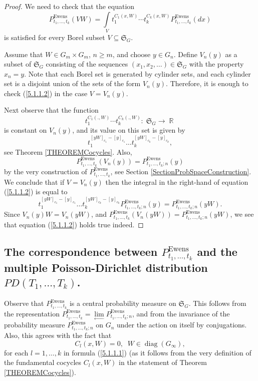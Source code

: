 \documentclass[12pt]{amsart}
\theoremstyle{definition}
\numberwithin{equation}{section}
\DeclareMathOperator{\R}{\mathbb{R}}
\DeclareMathOperator{\diag}{diag}
\DeclareMathOperator{\Ewens}{Ewens}
\begin{document}
\begin{proof}
We need to check that  the equation
\begin{equation}\label{5.1.1.2}
P_{t_1,\ldots,t_k}^{\Ewens}\left(VW\right)
=\int\limits_{V}t_1^{C_1\left(x,W\right)}\cdots t_k^{C_k\left(x,W\right)}
P_{t_1,\ldots,t_k}^{\Ewens}\left(dx\right)
\end{equation}
is satisfied for every Borel subset $V\subseteq\mathfrak{S}_{G}$.

Assume that $W\in G_m\times G_m$, $n\geq m$, and choose $y\in G_n$.
Define $V_n(y)$ as a subset of $\mathfrak{S}_{G}$ consisting of the sequences
$\left(x_1, x_2,\ldots\right)\in\mathfrak{S}_{G}$ with the property $x_n=y$.
Note that each Borel set is generated by cylinder sets, and each cylinder set is a disjoint union of the sets of the form $V_n(y)$. Therefore, it is enough to check (\ref{5.1.1.2}) in the case $V=V_n(y)$.

Next observe that the function
$$
t_1^{C_1\left(.,W\right)}\cdots t_k^{C_k\left(.,W\right)}:\;\mathfrak{S}_{G}\longrightarrow\R
$$
is constant on $V_n(y)$, and its value on this set is given by
$$
t_1^{\left[y W\right]_{c_1}-[y]_{c_1}}\ldots t_k^{\left[yW\right]_{c_k}-\left[y\right]_{c_k}},
$$
see Theorem \ref{THEOREMCocycles}. Also,
$$
P_{t_1,\ldots,t_k}^{\Ewens}\left(V_n(y)\right)=P_{t_1,\ldots,t_k;n}^{\Ewens}\left(y\right)
$$
by the very construction of $P_{t_1,\ldots,t_k}^{\Ewens}$, see Section \ref{SectionProbSpaceConstruction}. We conclude that if $V=V_n(y)$
then the integral in the right-hand of equation (\ref{5.1.1.2}) is equal to
\begin{equation}
t_1^{\left[y W\right]_{c_1}-[y]_{c_1}}\ldots t_k^{\left[yW\right]_{c_k}-\left[y\right]_{c_k}}
P_{t_1,\ldots,t_k;n}^{\Ewens}\left(y\right)=P_{t_1,\ldots,t_k;n}^{\Ewens}\left(yW\right).
\end{equation}
Since $V_n(y) W=V_n\left(yW\right)$, and
$P_{t_1,\ldots,t_k}^{\Ewens}\left(V_n\left(yW\right)\right)=
P_{t_1,\ldots,t_k;n}^{\Ewens}\left(yW\right)$, we see that equation (\ref{5.1.1.2}) holds true indeed.
\end{proof}
\subsection{The correspondence between $P_{t_1,\ldots,t_k}^{\Ewens}$ and the multiple Poisson-Dirichlet distribution $PD\left(T_1,\ldots,T_k\right)$.}
\label{CorPPD}
Observe that $P_{t_1,\ldots,t_k}^{\Ewens}$ is a central probability measure on $\mathfrak{S}_{G}$. This follows from  the representation $P_{t_1,\ldots,t_k}^{\Ewens}=\underset{\longleftarrow}{\lim} P_{t_1,\ldots,t_k; n}^{\Ewens}$, and from the invariance of the probability measure
$P_{t_1,\ldots,t_k; n}^{\Ewens}$ on $G_n$ under the action on itself by conjugations. Also, this agrees with the fact that
$$
C_l\left(x,W\right)=0,\;\; W\in\diag\left(G_{\infty}\right),
$$
for each $l=1,\ldots,k$ in formula (\ref{5.1.1.1}) (as it follows from the very definition of the fundamental cocycles $C_l\left(x,W\right)$ in the statement of Theorem \ref{THEOREMCocycles}).
\end{document}
